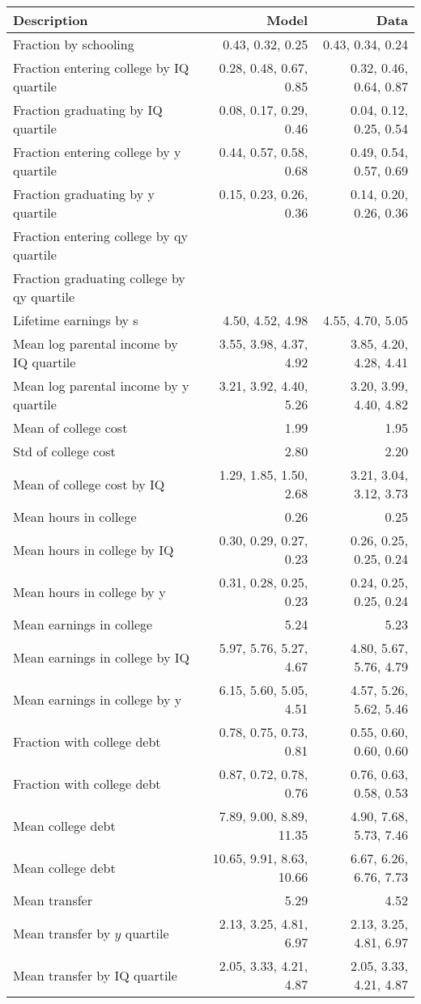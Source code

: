 \begin{tabular}{lrr}
\hline
Description & Model  & Data  \\
\hline
Fraction by schooling & 0.43, 0.32, 0.25  & 0.43, 0.34, 0.24  \\
Fraction entering college by IQ quartile & 0.28, 0.48, 0.67, 0.85  & 0.32, 0.46, 0.64, 0.87  \\
Fraction graduating by IQ quartile & 0.08, 0.17, 0.29, 0.46  & 0.04, 0.12, 0.25, 0.54  \\
Fraction entering college by y quartile & 0.44, 0.57, 0.58, 0.68  & 0.49, 0.54, 0.57, 0.69  \\
Fraction graduating by y quartile & 0.15, 0.23, 0.26, 0.36  & 0.14, 0.20, 0.26, 0.36  \\
Fraction entering college by qy quartile &   &   \\
Fraction graduating college by qy quartile &   &   \\
Lifetime earnings by s & 4.50, 4.52, 4.98  & 4.55, 4.70, 5.05  \\
Mean log parental income by IQ quartile & 3.55, 3.98, 4.37, 4.92  & 3.85, 4.20, 4.28, 4.41  \\
Mean log parental income by y quartile & 3.21, 3.92, 4.40, 5.26  & 3.20, 3.99, 4.40, 4.82  \\
Mean of college cost & 1.99  & 1.95  \\
Std of college cost & 2.80  & 2.20  \\
Mean of college cost by IQ & 1.29, 1.85, 1.50, 2.68  & 3.21, 3.04, 3.12, 3.73  \\
Mean hours in college & 0.26  & 0.25  \\
Mean hours in college by IQ & 0.30, 0.29, 0.27, 0.23  & 0.26, 0.25, 0.25, 0.24  \\
Mean hours in college by y & 0.31, 0.28, 0.25, 0.23  & 0.24, 0.25, 0.25, 0.24  \\
Mean earnings in college & 5.24  & 5.23  \\
Mean earnings in college by IQ & 5.97, 5.76, 5.27, 4.67  & 4.80, 5.67, 5.76, 4.79  \\
Mean earnings in college by y & 6.15, 5.60, 5.05, 4.51  & 4.57, 5.26, 5.62, 5.46  \\
Fraction with college debt & 0.78, 0.75, 0.73, 0.81  & 0.55, 0.60, 0.60, 0.60  \\
Fraction with college debt & 0.87, 0.72, 0.78, 0.76  & 0.76, 0.63, 0.58, 0.53  \\
Mean college debt & 7.89, 9.00, 8.89, 11.35  & 4.90, 7.68, 5.73, 7.46  \\
Mean college debt & 10.65, 9.91, 8.63, 10.66  & 6.67, 6.26, 6.76, 7.73  \\
Mean transfer & 5.29  & 4.52  \\
Mean transfer by $y$ quartile & 2.13, 3.25, 4.81, 6.97  & 2.13, 3.25, 4.81, 6.97  \\
Mean transfer by IQ quartile & 2.05, 3.33, 4.21, 4.87  & 2.05, 3.33, 4.21, 4.87  \\
\hline
\end{tabular}%
